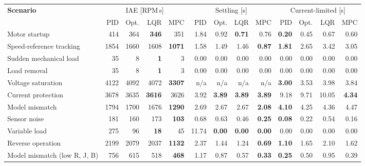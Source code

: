 \begin{tabular}{@{}lrrrrrrrrrrrr@{}}
\toprule
\textbf{Scenario} & \multicolumn{4}{c}{IAE [RPM\,s]} & \multicolumn{4}{c}{Settling [s]} & \multicolumn{4}{c}{Current-limited [s]} \\
\cmidrule(lr){2-5}\cmidrule(lr){6-9}\cmidrule(lr){10-13}
 & PID & Opt. & LQR & MPC & PID & Opt. & LQR & MPC & PID & Opt. & LQR & MPC \\
\midrule
Motor startup & 414 & 364 & \cellcolor{best}\textbf{346} & 351 & 1.84 & 0.92 & \cellcolor{best}\textbf{0.71} & 0.76 & \cellcolor{best}\textbf{0.20} & 0.45 & 0.67 & 0.60 \\
Speed-reference tracking & 1854 & 1660 & 1608 & \cellcolor{best}\textbf{1071} & 1.58 & 1.49 & 1.46 & \cellcolor{best}\textbf{0.87} & \cellcolor{best}\textbf{1.81} & 2.65 & 3.42 & 3.05 \\
Sudden mechanical load & 35 & 8 & \cellcolor{best}\textbf{1} & 3 & 0.00 & 0.00 & 0.00 & 0.00 & 0.00 & 0.00 & 0.00 & 0.00 \\
Load removal & 35 & 8 & \cellcolor{best}\textbf{1} & 3 & 0.00 & 0.00 & 0.00 & 0.00 & 0.00 & 0.00 & 0.00 & 0.00 \\
Voltage saturation & 4122 & 4092 & 4072 & \cellcolor{best}\textbf{3307} & n/a & n/a & n/a & n/a & \cellcolor{best}\textbf{3.00} & 3.53 & 3.98 & 3.84 \\
Current protection & 3678 & 3635 & \cellcolor{best}\textbf{3616} & 3626 & 3.92 & \cellcolor{best}\textbf{3.89} & \cellcolor{best}\textbf{3.89} & \cellcolor{best}\textbf{3.89} & 9.18 & 9.71 & 10.05 & \cellcolor{best}\textbf{4.34} \\
Model mismatch & 1794 & 1700 & 1676 & \cellcolor{best}\textbf{1290} & 2.69 & 2.67 & 2.67 & \cellcolor{best}\textbf{2.08} & \cellcolor{best}\textbf{4.10} & 4.25 & 4.36 & 4.47 \\
Sensor noise & 181 & 160 & 173 & \cellcolor{best}\textbf{103} & 0.68 & 0.63 & 0.46 & \cellcolor{best}\textbf{0.25} & \cellcolor{best}\textbf{0.08} & 0.22 & 0.54 & 0.16 \\
Variable load & 275 & 96 & \cellcolor{best}\textbf{18} & 45 & 11.74 & \cellcolor{best}\textbf{0.00} & \cellcolor{best}\textbf{0.00} & \cellcolor{best}\textbf{0.00} & 0.00 & 0.00 & 0.00 & 0.00 \\
Reverse operation & 2199 & 2079 & 2037 & \cellcolor{best}\textbf{1132} & 2.37 & 1.44 & 1.24 & \cellcolor{best}\textbf{0.69} & \cellcolor{best}\textbf{1.10} & 1.65 & 2.10 & 1.62 \\
Model mismatch (low R, J, B) & 756 & 615 & 518 & \cellcolor{best}\textbf{468} & 1.17 & 0.87 & 0.57 & \cellcolor{best}\textbf{0.33} & \cellcolor{best}\textbf{0.25} & 0.50 & 0.95 & 0.39 \\
\bottomrule
\end{tabular}
